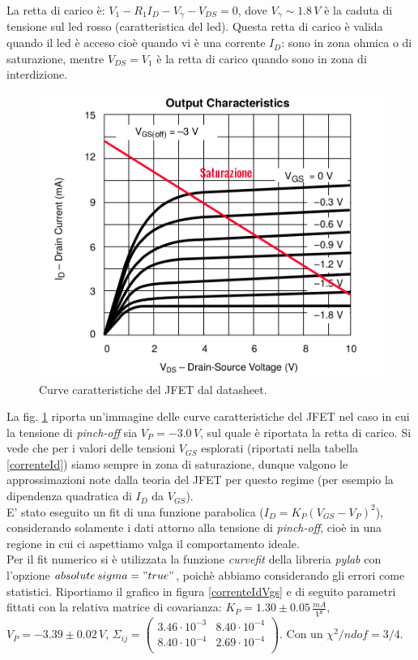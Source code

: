 \documentclass[10pt,a4paper]{article}
\begin{document}
La retta di carico è: $V_1 - R_1 I_D-V_{\gamma}-V_{DS} = 0$, dove $V_{\gamma} \sim 1.8 \, V$ è la caduta di tensione sul led rosso (caratteristica del led). Questa retta di carico è valida quando il led è acceso cioè quando vi è una corrente $I_D$: sono in zona ohmica o di saturazione, mentre $V_{DS} = V_1$ è la retta di carico quando sono in zona di interdizione.\\

\begin{figure}
\centering
\includegraphics[scale=0.4]{char2.png}
\caption{Curve caratteristiche del JFET dal datasheet.\label{curveCaratteristiche}}
\end{figure}

La fig. \ref{curveCaratteristiche} riporta un'immagine delle curve caratteristiche del JFET nel caso in cui la tensione di \emph{pinch-off} sia $V_P = -3.0\,V$, sul quale è riportata la retta di carico. Si vede che per i valori delle tensioni $V_{GS}$ esplorati (riportati nella tabella \ref{correnteId}) siamo sempre in zona di saturazione, dunque valgono le approssimazioni note dalla teoria del JFET per questo regime (per esempio la dipendenza quadratica di $I_D$ da $V_{GS}$).\\
E' stato eseguito un fit di una funzione parabolica ($I_D = K_P (V_{GS} - V_P)^2$), considerando solamente i dati attorno alla tensione di \emph{pinch-off}, cioè in una regione in cui ci aspettiamo valga il comportamento ideale. \\
Per il fit numerico si è utilizzata la funzione \emph{curvefit} della libreria \emph{pylab} con l'opzione \emph{$absolute\,sigma = "true"$}, poichè abbiamo considerando gli errori come statistici. Riportiamo il grafico in figura \ref{correnteIdVgs} e di seguito parametri fittati con la relativa matrice di covarianza: $K_P = 1.30 \pm 0.05 \, \frac{mA}{V^2}$, $V_P = -3.39 \pm 0.02 \, V$,  $ \Sigma_{ij} = \left( \begin{array}{cc}
3.46 \cdot 10^{-3} & 8.40 \cdot 10^{-4} \\ 
8.40 \cdot 10^{-4} & 2.69 \cdot 10^{-4}\\
\end{array} \right)$. Con un $\chi^2/ndof = 3/4$.
\end{document}
